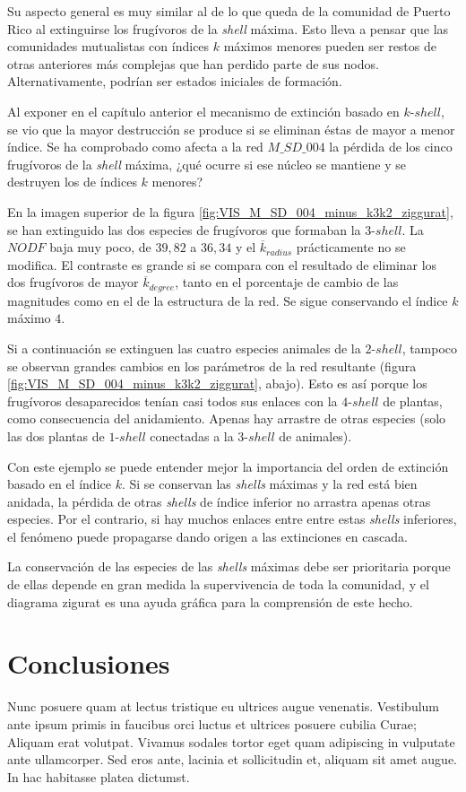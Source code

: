 Su aspecto general es muy similar al de lo que queda de la comunidad de Puerto Rico al extinguirse los frugívoros de la \textit{shell} máxima. Esto lleva a pensar que las comunidades mutualistas con índices $k$ máximos menores pueden ser restos de otras anteriores más complejas que han perdido parte de sus nodos. Alternativamente, podrían ser estados iniciales de formación.

Al exponer en el capítulo anterior el mecanismo de extinción basado en $k$-$shell$, se vio que la mayor destrucción se produce si se eliminan éstas de mayor a menor índice. Se ha comprobado como afecta a la red $M\_SD\_004$ la pérdida de los cinco frugívoros de la \textit{shell} máxima, ¿qué ocurre si ese núcleo se mantiene y se destruyen los de índices $k$ menores?

En la imagen superior de la figura \ref{fig:VIS_M_SD_004_minus_k3k2_ziggurat}, se han extinguido las dos especies de frugívoros que formaban la $3$-$shell$. La $NODF$ baja muy poco, de $39,82$ a $36,34$ y el $\overline k_{radius}$ prácticamente no se modifica. El contraste es grande si se compara con el resultado de eliminar los dos frugívoros de mayor $\overline k_{degree}$, tanto en el porcentaje de cambio de las magnitudes como en el de la estructura de la red. Se sigue conservando el índice $k$ máximo $4$.

Si a continuación se extinguen las cuatro especies animales de la $2$-$shell$, tampoco se observan grandes cambios en los parámetros de la red resultante (figura \ref{fig:VIS_M_SD_004_minus_k3k2_ziggurat}, abajo). Esto es así porque los frugívoros desaparecidos tenían casi todos sus enlaces con la $4$-$shell$ de plantas, como consecuencia del anidamiento. Apenas hay arrastre de otras especies (solo las dos plantas de $1$-$shell$ conectadas a la $3$-$shell$ de animales).

Con este ejemplo se puede entender mejor la importancia del orden de extinción basado en el índice $k$. Si se conservan las \textit{shells} máximas y la red está bien anidada, la pérdida de otras \textit{shells} de índice inferior no arrastra apenas otras especies. Por el contrario, si hay muchos enlaces entre entre estas \textit{shells} inferiores, el fenómeno puede propagarse dando origen a las extinciones en cascada.

La conservación de las especies de las \textit{shells} máximas debe ser prioritaria porque de ellas depende en gran medida la supervivencia de toda la comunidad, y el diagrama zigurat es una ayuda gráfica para la comprensión de este hecho.

\clearpage
\section{Conclusiones}

Nunc posuere quam at lectus tristique eu ultrices augue venenatis. Vestibulum ante ipsum primis in faucibus orci luctus et ultrices posuere cubilia Curae; Aliquam erat volutpat. Vivamus sodales tortor eget quam adipiscing in vulputate ante ullamcorper. Sed eros ante, lacinia et sollicitudin et, aliquam sit amet augue. In hac habitasse platea dictumst.
